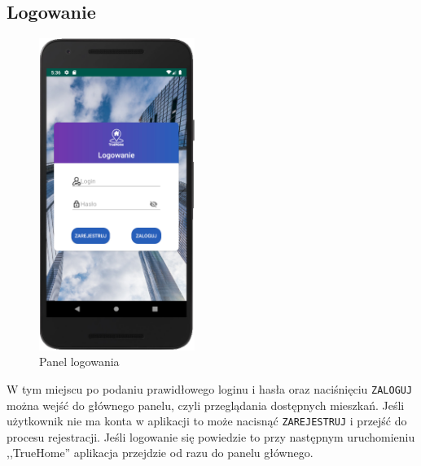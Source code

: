 \documentclass[polish, 11pt]{article}
\begin{document}
    \subsection{Logowanie}
        \begin{figure}[H]
                    \centering
                    \includegraphics[width=0.45\textwidth]{aplikacja/logowanie.png}
                    \caption{Panel logowania}
        \end{figure}
        
         W tym miejscu po podaniu prawidłowego loginu i hasła oraz naciśnięciu \texttt{ZALOGUJ} można wejść do głównego panelu, czyli przeglądania dostępnych mieszkań. Jeśli użytkownik nie ma konta w aplikacji to może nacisnąć \texttt{ZAREJESTRUJ} i przejść do procesu rejestracji. Jeśli logowanie się powiedzie to przy następnym uruchomieniu ,,TrueHome'' aplikacja przejdzie od razu do panelu głównego.
\end{document}
